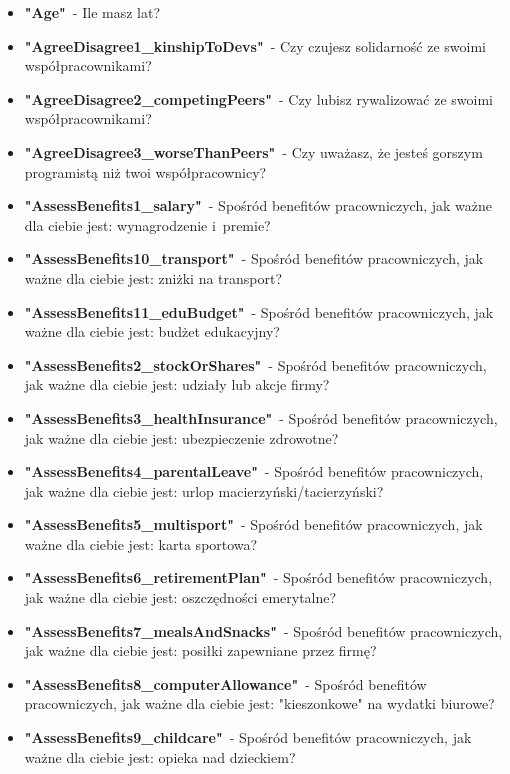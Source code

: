 \begin{appendices}
    \begin{itemize}
        \item \textbf{"Age"}~- Ile masz lat?
        \item \textbf{"AgreeDisagree1\_kinshipToDevs"}~- Czy czujesz solidarność ze swoimi współpracownikami?
        \item \textbf{"AgreeDisagree2\_competingPeers"}~- Czy lubisz rywalizować ze swoimi współpracownikami?
        \item \textbf{"AgreeDisagree3\_worseThanPeers"}~- Czy uważasz, że jesteś gorszym programistą niż twoi współpracownicy?
        \item \textbf{"AssessBenefits1\_salary"}~- Spośród benefitów pracowniczych, jak ważne dla ciebie jest: wynagrodzenie i~premie?
        \item \textbf{"AssessBenefits10\_transport"}~- Spośród benefitów pracowniczych, jak ważne dla ciebie jest: zniżki na transport?
        \item \textbf{"AssessBenefits11\_eduBudget"}~- Spośród benefitów pracowniczych, jak ważne dla ciebie jest: budżet edukacyjny?
        \item \textbf{"AssessBenefits2\_stockOrShares"}~- Spośród benefitów pracowniczych, jak ważne dla ciebie jest: udziały lub akcje firmy?
        \item \textbf{"AssessBenefits3\_healthInsurance"}~- Spośród benefitów pracowniczych, jak ważne dla ciebie jest: ubezpieczenie zdrowotne?
        \item \textbf{"AssessBenefits4\_parentalLeave"}~- Spośród benefitów pracowniczych, jak ważne dla ciebie jest: urlop macierzyński/tacierzyński?
        \item \textbf{"AssessBenefits5\_multisport"}~- Spośród benefitów pracowniczych, jak ważne dla ciebie jest: karta sportowa?
        \item \textbf{"AssessBenefits6\_retirementPlan"}~- Spośród benefitów pracowniczych, jak ważne dla ciebie jest: oszczędności emerytalne?
        \item \textbf{"AssessBenefits7\_mealsAndSnacks"}~- Spośród benefitów pracowniczych, jak ważne dla ciebie jest: posiłki zapewniane przez firmę?
        \item \textbf{"AssessBenefits8\_computerAllowance"}~- Spośród benefitów pracowniczych, jak ważne dla ciebie jest: "kieszonkowe" na wydatki biurowe?
        \item \textbf{"AssessBenefits9\_childcare"}~- Spośród benefitów pracowniczych, jak ważne dla ciebie jest: opieka nad dzieckiem?

\end{itemize}
\end{appendices}
